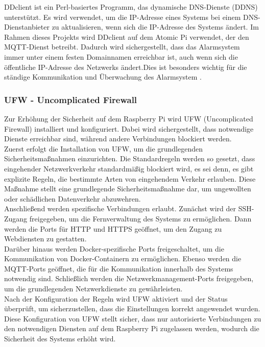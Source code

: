 DDclient ist ein Perl-basiertes Programm, das dynamische DNS-Dienste (DDNS) unterstützt. Es wird verwendet, um die IP-Adresse eines Systems bei einem DNS-Dienstanbieter zu aktualisieren, wenn sich die IP-Adresse des Systems ändert. Im Rahmen dieses Projekts wird DDclient auf dem Atomic Pi verwendet, der den MQTT-Dienst betreibt. Dadurch wird sichergestellt, dass das Alarmsystem immer unter einem festen Domainnamen erreichbar ist, auch wenn sich die öffentliche IP-Adresse des Netzwerks ändert.Dies ist besonders wichtig für die ständige Kommunikation und Überwachung des Alarmsystem \cite{Ddclient}.


\subsubsection{UFW - Uncomplicated Firewall}

Zur Erhöhung der Sicherheit auf dem Raspberry Pi wird UFW (Uncomplicated Firewall) installiert und konfiguriert. Dabei wird sichergestellt, dass notwendige Dienste erreichbar sind, während andere Verbindungen blockiert werden.\\

Zuerst erfolgt die Installation von UFW, um die grundlegenden Sicherheitsmaßnahmen einzurichten. Die Standardregeln werden so gesetzt, dass eingehender Netzwerkverkehr standardmäßig blockiert wird, es sei denn, es gibt explizite Regeln, die bestimmte Arten von eingehendem Verkehr erlauben. Diese Maßnahme stellt eine grundlegende Sicherheitsmaßnahme dar, um ungewollten oder schädlichen Datenverkehr abzuwehren.\\

Anschließend werden spezifische Verbindungen erlaubt. Zunächst wird der SSH-Zugang freigegeben, um die Fernverwaltung des Systems zu ermöglichen. Dann werden die Ports für HTTP und HTTPS geöffnet, um den Zugang zu Webdiensten zu gestatten.\\

Darüber hinaus werden Docker-spezifische Ports freigeschaltet, um die Kommunikation von Docker-Containern zu ermöglichen. Ebenso werden die MQTT-Ports geöffnet, die für die Kommunikation innerhalb des Systems notwendig sind. Schließlich werden die Netzwerkmanagement-Ports freigegeben, um die grundlegenden Netzwerkdienste zu gewährleisten.\\

Nach der Konfiguration der Regeln wird UFW aktiviert und der Status überprüft, um sicherzustellen, dass die Einstellungen korrekt angewendet wurden. Diese Konfiguration von UFW stellt sicher, dass nur autorisierte Verbindungen zu den notwendigen Diensten auf dem Raspberry Pi zugelassen werden, wodurch die Sicherheit des Systems erhöht wird.



